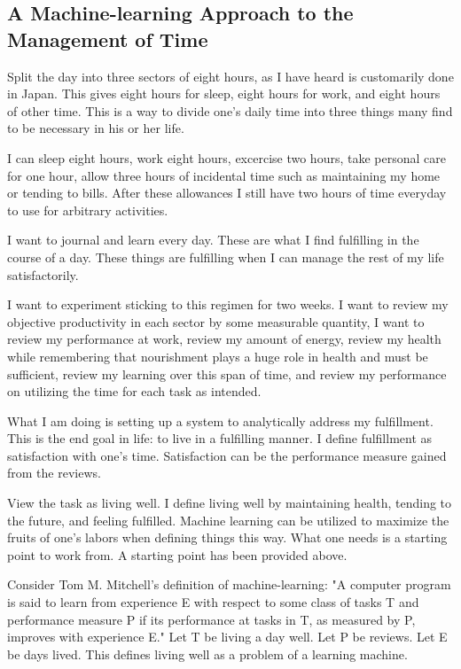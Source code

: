 \subsection*{ A Machine-learning Approach to the Management of Time }
Split the day into three sectors of eight hours, as I have heard is customarily done in Japan. This gives eight hours for sleep, eight hours for work, and eight hours of other time. This is a way to divide one's daily time into three things many find to be necessary in his or her life.

I can sleep eight hours, work eight hours, excercise two hours, take personal care for one hour, allow three hours of incidental time such as maintaining my home or tending to bills. After these allowances I still have two hours of time everyday to use for arbitrary activities.

I want to journal and learn every day. These are what I find fulfilling in the course of a day. These things are fulfilling when I can manage the rest of my life satisfactorily.

I want to experiment sticking to this regimen for two weeks. I want to review my objective productivity in each sector by some measurable quantity, I want to review my performance at work, review my amount of energy, review my health while remembering that nourishment plays a huge role in health and must be sufficient, review my learning over this span of time, and review my performance on utilizing the time for each task as intended.

What I am doing is setting up a system to analytically address my fulfillment. This is the end goal in life: to live in a fulfilling manner. I define fulfillment as satisfaction with one's time. Satisfaction can be the performance measure gained from the reviews.

View the task as living well. I define living well by maintaining health, tending to the future, and feeling fulfilled. Machine learning can be utilized to maximize the fruits of one's labors when defining things this way. What one needs is a starting point to work from. A starting point has been provided above. 

Consider Tom M. Mitchell's definition of machine-learning: "A computer program is said to learn from experience E with respect to some class of tasks T and performance measure P if its performance at tasks in T, as measured by P, improves with experience E." Let T be living a day well. Let P be reviews. Let E be days lived. This defines living well as a problem of a learning machine.

